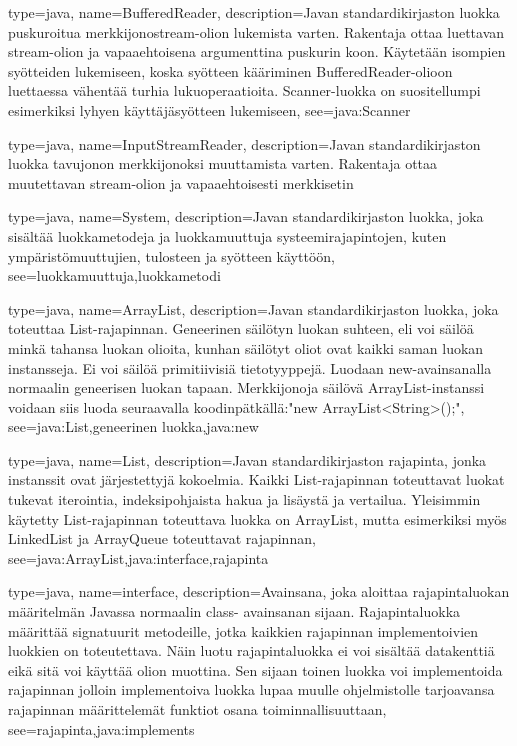 {
	type=java,
	name=BufferedReader,
	description={Javan standardikirjaston luokka puskuroitua merkkijonostream-olion lukemista
varten. Rakentaja ottaa luettavan stream-olion ja vapaaehtoisena argumenttina puskurin koon.
Käytetään isompien syötteiden lukemiseen, koska syötteen kääriminen BufferedReader-olioon
luettaessa vähentää turhia lukuoperaatioita. Scanner-luokka on suositellumpi esimerkiksi
lyhyen käyttäjäsyötteen lukemiseen},
	see=java:Scanner
}

{
	type=java,
	name=InputStreamReader,
	description={Javan standardikirjaston luokka tavujonon merkkijonoksi muuttamista varten.
Rakentaja ottaa muutettavan stream-olion ja vapaaehtoisesti merkkisetin}
}

{
	type=java,
	name=System,
	description={Javan standardikirjaston luokka, joka sisältää luokkametodeja ja luokkamuuttuja
systeemirajapintojen, kuten ympäristömuuttujien, tulosteen ja syötteen käyttöön},
	see={luokkamuuttuja,luokkametodi}
}

{
	type=java,
	name=ArrayList,
	description={Javan standardikirjaston luokka, joka toteuttaa List-rajapinnan. Geneerinen
säilötyn luokan suhteen, eli voi säilöä minkä tahansa luokan olioita, kunhan säilötyt oliot ovat
kaikki saman luokan instansseja. Ei voi säilöä primitiivisiä tietotyyppejä. Luodaan
new-avainsanalla  normaalin geneerisen luokan tapaan. Merkkijonoja säilövä ArrayList-instanssi
voidaan siis luoda seuraavalla koodinpätkällä:\newline{}"new ArrayList<String>();"},
	see={java:List,geneerinen luokka,java:new}
}

{
	type=java,
	name=List,
	description={Javan standardikirjaston rajapinta, jonka instanssit ovat järjestettyjä
kokoelmia. Kaikki List-rajapinnan toteuttavat luokat tukevat iterointia, indeksipohjaista hakua
ja lisäystä ja vertailua. Yleisimmin käytetty List-rajapinnan toteuttava luokka on ArrayList,
mutta esimerkiksi myös LinkedList ja ArrayQueue toteuttavat rajapinnan},
	see={java:ArrayList,java:interface,rajapinta}
}

{
	type=java,
	name=interface,
	description={Avainsana, joka aloittaa rajapintaluokan määritelmän Javassa normaalin class-
avainsanan sijaan. Rajapintaluokka määrittää signatuurit metodeille, jotka kaikkien rajapinnan
implementoivien luokkien on toteutettava. Näin luotu rajapintaluokka ei voi sisältää datakenttiä
eikä sitä voi käyttää olion muottina. Sen sijaan toinen luokka voi implementoida rajapinnan
jolloin implementoiva luokka lupaa muulle ohjelmistolle tarjoavansa rajapinnan määrittelemät
funktiot osana toiminnallisuuttaan},
	see={rajapinta,java:implements}
}

